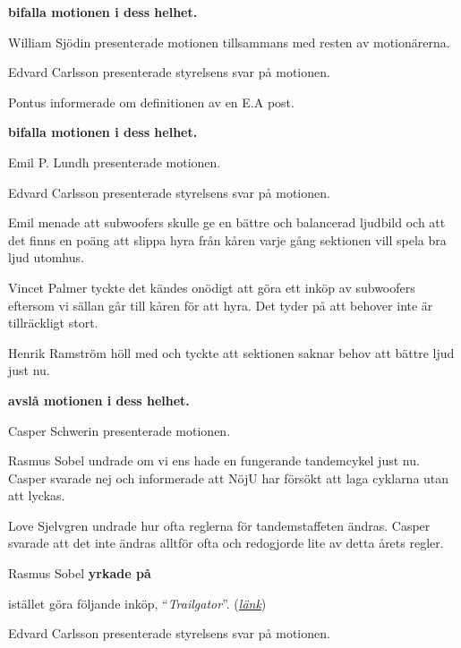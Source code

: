 \documentclass[10pt]{article}
\begin{document}
\begin{paragrafer}
\begin{paragrafer}
      \textbf{\Mba bifalla motionen i dess helhet.}


      William Sjödin presenterade motionen tillsammans med resten av motionärerna. 

      Edvard Carlsson presenterade styrelsens svar på motionen. 

      Pontus informerade om definitionen av en E.A post. 

      \textbf{\Mba bifalla motionen i dess helhet.}


      Emil P. Lundh presenterade motionen. 

      Edvard Carlsson presenterade styrelsens svar på motionen. 

      Emil menade att subwoofers skulle ge en bättre och balancerad ljudbild och att det finns en poäng att slippa hyra från kåren varje gång sektionen vill spela bra ljud utomhus. 

      Vincet Palmer tyckte det kändes onödigt att göra ett inköp av subwoofers eftersom vi sällan går till kåren för att hyra. Det tyder på att behover inte är tillräckligt stort. 

      Henrik Ramström höll med och tyckte att sektionen saknar behov att bättre ljud just nu. 
 
      \textbf{\Mba avslå motionen i dess helhet. }

      Casper Schwerin presenterade motionen. 

      Rasmus Sobel undrade om vi ens hade en fungerande tandemcykel just nu. Casper svarade nej och informerade att NöjU har försökt att laga cyklarna utan att lyckas. 

      Love Sjelvgren undrade hur ofta reglerna för tandemstaffeten ändras. Casper svarade att det inte ändras alltför ofta och redogjorde lite av detta årets regler.

      Rasmus Sobel \textbf{yrkade på} 
      \begin{attsatser}
        \att istället göra följande inköp, ``\textit{Trailgator}''. (\href{https://www.atredo.se/paahngscyklar/trail-gator---dragstaang?gclid=EAIaIQobChMIjv7j6MPl5QIVE853Ch0QYwiuEAQYBSABEgKoHvD_BwE}{\textit{länk}})
      \end{attsatser}
      Edvard Carlsson presenterade styrelsens svar på motionen.  


\end{paragrafer}
\end{paragrafer}
\end{document}
